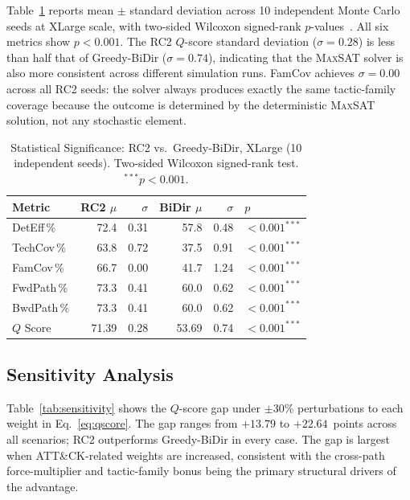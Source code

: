 \documentclass[journal]{IEEEtran}
\newcommand{\MAXSAT}{\textsc{MaxSAT}}
\newcommand{\qscore}{$Q$-score}
\begin{document}
Table~\ref{tab:stats} reports mean $\pm$ standard deviation across 10
independent Monte Carlo seeds at XLarge scale, with two-sided Wilcoxon
signed-rank $p$-values~\cite{wilcoxon1945}. All six metrics show
$p<0.001$. The RC2 $Q$-score standard deviation ($\sigma=0.28$) is
less than half that of Greedy-BiDir ($\sigma=0.74$), indicating that
the \MAXSAT{} solver is also more consistent across different
simulation runs. FamCov achieves $\sigma=0.00$ across all RC2 seeds:
the solver always produces exactly the same tactic-family coverage
because the outcome is determined by the deterministic \MAXSAT{}
solution, not any stochastic element.

\begin{table}[t]
\caption{Statistical Significance: RC2 vs.\ Greedy-BiDir, XLarge
  (10 independent seeds). Two-sided Wilcoxon signed-rank test.
  $^{***}p<0.001$.}
\label{tab:stats}
\centering
\renewcommand{\arraystretch}{1.2}
\begin{tabular}{lrrrrl}
\toprule
Metric & RC2 $\mu$ & $\sigma$ & BiDir $\mu$ & $\sigma$ & $p$ \\
\midrule
DetEff\,\%  & 72.4 & 0.31 & 57.8 & 0.48 & $<0.001^{***}$ \\
TechCov\,\% & 63.8 & 0.72 & 37.5 & 0.91 & $<0.001^{***}$ \\
FamCov\,\%  & 66.7 & 0.00 & 41.7 & 1.24 & $<0.001^{***}$ \\
FwdPath\,\% & 73.3 & 0.41 & 60.0 & 0.62 & $<0.001^{***}$ \\
BwdPath\,\% & 73.3 & 0.41 & 60.0 & 0.62 & $<0.001^{***}$ \\
$Q$ Score   & 71.39 & 0.28 & 53.69 & 0.74 & $<0.001^{***}$ \\
\bottomrule
\end{tabular}
\end{table}

\subsection{Sensitivity Analysis}
\label{sec:results:sensitivity}

Table~\ref{tab:sensitivity} shows the \qscore{} gap under $\pm30\%$
perturbations to each weight in Eq.~\eqref{eq:qscore}. The gap ranges
from $+13.79$ to $+22.64$~points across all scenarios; RC2 outperforms
Greedy-BiDir in every case. The gap is largest when ATT\&CK-related
weights are increased, consistent with the cross-path force-multiplier
and tactic-family bonus being the primary structural drivers of the
advantage.
\end{document}
